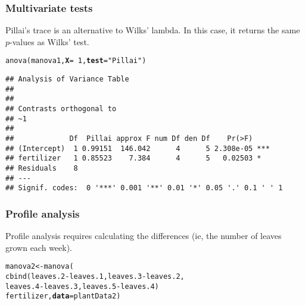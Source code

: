 \documentclass[color=usenames,dvipsnames]{beamer}\usepackage[]{graphicx}\usepackage[]{color}
\makeatletter
\newcommand{\hlnum}[1]{\textcolor[rgb]{0.69,0.494,0}{#1}}%
\newcommand{\hlstr}[1]{\textcolor[rgb]{0.749,0.012,0.012}{#1}}%
\newcommand{\hlopt}[1]{\textcolor[rgb]{0,0,0}{#1}}%
\newcommand{\hlstd}[1]{\textcolor[rgb]{0,0,0}{#1}}%
\newcommand{\hlkwb}[1]{\textcolor[rgb]{0,0.341,0.682}{#1}}%
\newcommand{\hlkwc}[1]{\textcolor[rgb]{0,0,0}{\textbf{#1}}}%
\newcommand{\hlkwd}[1]{\textcolor[rgb]{0.004,0.004,0.506}{#1}}%
\newenvironment{kframe}{%
 \def\at@end@of@kframe{}%
 \ifinner\ifhmode%
  \def\at@end@of@kframe{\end{minipage}}%
  \begin{minipage}{\columnwidth}%
 \fi\fi%
 \def\FrameCommand##1{\hskip\@totalleftmargin \hskip-\fboxsep
 \colorbox{shadecolor}{##1}\hskip-\fboxsep
     \hskip-\linewidth \hskip-\@totalleftmargin \hskip\columnwidth}%
 \MakeFramed {\advance\hsize-\width
   \@totalleftmargin\z@ \linewidth\hsize
   \@setminipage}}%
 {\par\unskip\endMakeFramed%
 \at@end@of@kframe}
\newenvironment{knitrout}{}{} %
\makeatother
\begin{document}
\begin{frame}[fragile]
  \frametitle{Multivariate tests}
  \small
  {%
    Pillai's trace is an alternative to Wilks' lambda. In this
    case, it returns the same $p$-values as Wilks' test.}
  \vfill
  \footnotesize
\begin{knitrout}\footnotesize
{}\color{fgcolor}\begin{kframe}
\begin{alltt}
\hlkwd{anova}\hlstd{(manova1,} \hlkwc{X}\hlstd{=}\hlopt{~}\hlnum{1}\hlstd{,} \hlkwc{test}\hlstd{=}\hlstr{"Pillai"}\hlstd{)}
\end{alltt}
\begin{verbatim}
## Analysis of Variance Table
## 
## 
## Contrasts orthogonal to
## ~1
## 
##             Df  Pillai approx F num Df den Df    Pr(>F)    
## (Intercept)  1 0.99151  146.042      4      5 2.308e-05 ***
## fertilizer   1 0.85523    7.384      4      5   0.02503 *  
## Residuals    8                                             
## ---
## Signif. codes:  0 '***' 0.001 '**' 0.01 '*' 0.05 '.' 0.1 ' ' 1
\end{verbatim}
\end{kframe}
\end{knitrout}

\end{frame}












\begin{frame}[fragile]
  \frametitle{Profile analysis}
  {%
    Profile analysis requires calculating the differences (ie, the
    number of leaves grown each week).}
  \vspace{1cm}
  \footnotesize
\begin{knitrout}\footnotesize
{}\color{fgcolor}\begin{kframe}
\begin{alltt}
\hlstd{manova2} \hlkwb{<-} \hlkwd{manova}\hlstd{(}
    \hlkwd{cbind}\hlstd{(leaves.2}\hlopt{-}\hlstd{leaves.1, leaves.3}\hlopt{-}\hlstd{leaves.2,}
          \hlstd{leaves.4}\hlopt{-}\hlstd{leaves.3, leaves.5}\hlopt{-}\hlstd{leaves.4)} \hlopt{~}
    \hlstd{fertilizer,} \hlkwc{data}\hlstd{=plantData2)}
\end{alltt}
\end{kframe}
\end{knitrout}
\end{frame}
\end{document}
